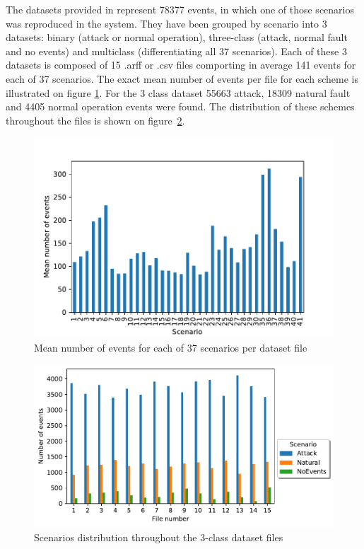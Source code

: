 The datasets provided in \cite{morris_industrial_nodate} represent 78377 events, in which one of those scenarios was reproduced in the system. They have been grouped by scenario into 3 datasets: binary (attack or normal operation), three-class (attack, normal fault and no events) and multiclass (differentiating all 37 scenarios). Each of these 3 datasets is composed of 15 .arff or .csv files comporting in average 141 events for each of 37 scenarios. The exact mean number of events per file for each scheme is illustrated on figure \ref{fig:scen_distro_37}. For the 3 class dataset 55663 attack, 18309 natural fault and 4405 normal operation events were found. The distribution of these schemes throughout the files is shown on figure~\ref{fig:scen_distro_file}.

\begin{figure}[H]
    \centering
    \includegraphics[]{images/distr_allscen.pdf}
    \caption{Mean number of events for each of 37 scenarios per dataset file} \label{fig:scen_distro_37}
\end{figure}

\begin{figure}[H]
    \centering
    \includegraphics[]{images/distr_3classes.pdf}
    \caption{Scenarios distribution throughout the 3-class dataset files}
    \label{fig:scen_distro_file}
\end{figure}

